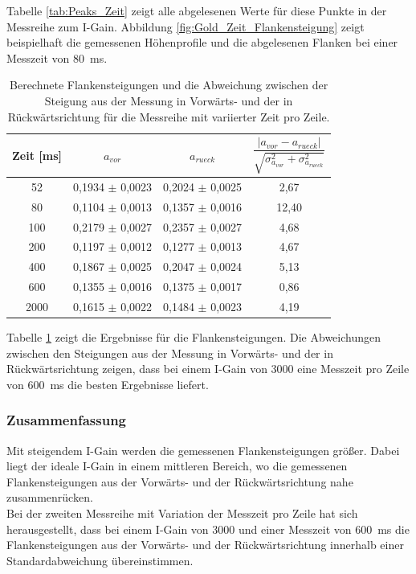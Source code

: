 \documentclass[12pt,a4paper]{article}
\begin{document}
Tabelle \ref{tab:Peaks_Zeit} zeigt alle abgelesenen Werte für diese Punkte in der Messreihe zum I-Gain. Abbildung \ref{fig:Gold_Zeit_Flankensteigung} zeigt beispielhaft die gemessenen Höhenprofile und die abgelesenen Flanken bei einer Messzeit von \SI{80}{ms}.

\begin{table}
\centering
\begin{tabular}{|c|c|c|c|}
\hline 
Zeit [ms] & $a_{vor}$ & $a_{rueck}$ & $\dfrac{|a_{vor} - a_{rueck}|}{\sqrt{\sigma _{a_{vor}}^2 + \sigma _{a_{rueck}}^2}}$ \\ 
\hline 
52 & 0,1934 $\pm$ 0,0023 & 0,2024 $\pm$ 0,0025 & 2,67 \\
\hline 
80 & 0,1104 $\pm$ 0,0013 & 0,1357 $\pm$ 0,0016 & 12,40 \\ 
\hline 
100 & 0,2179 $\pm$ 0,0027 & 0,2357 $\pm$ 0,0027 & 4,68 \\
\hline 
200 & 0,1197 $\pm$ 0,0012 & 0,1277 $\pm$ 0,0013 & 4,67 \\
\hline 
400 & 0,1867 $\pm$ 0,0025 & 0,2047 $\pm$ 0,0024 & 5,13 \\
\hline 
600 & 0,1355 $\pm$ 0,0016 & 0,1375 $\pm$ 0,0017 & 0,86 \\
\hline 
2000 & 0,1615 $\pm$ 0,0022 & 0,1484 $\pm$ 0,0023 & 4,19 \\
\hline 
\end{tabular} 
\caption{Berechnete Flankensteigungen und die Abweichung zwischen der Steigung aus der Messung in Vorwärts- und der in Rückwärtsrichtung für die Messreihe mit variierter Zeit pro Zeile.}
\label{tab:Steigungen_Zeit}
\end{table}

Tabelle \ref{tab:Steigungen_Zeit} zeigt die Ergebnisse für die Flankensteigungen. Die Abweichungen zwischen den Steigungen aus der Messung in Vorwärts- und der in Rückwärtsrichtung zeigen, dass bei einem I-Gain von 3000 eine Messzeit pro Zeile von \SI{600}{ms} die besten Ergebnisse liefert.

\subsubsection{Zusammenfassung}
Mit steigendem I-Gain werden die gemessenen Flankensteigungen größer. Dabei liegt der ideale I-Gain in einem mittleren Bereich, wo die gemessenen Flankensteigungen aus der Vorwärts- und der Rückwärtsrichtung nahe zusammenrücken. \\
Bei der zweiten Messreihe mit Variation der Messzeit pro Zeile hat sich herausgestellt, dass bei einem I-Gain von 3000 und einer Messzeit von \SI{600}{ms} die Flankensteigungen aus der Vorwärts- und der Rückwärtsrichtung innerhalb einer Standardabweichung übereinstimmen.
\end{document}
